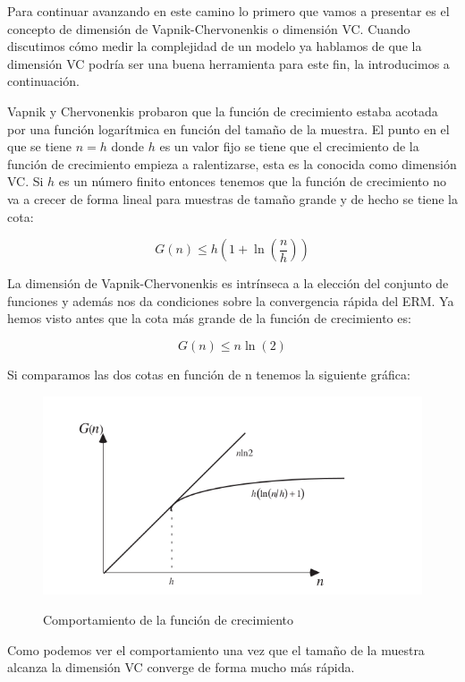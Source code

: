Para continuar avanzando en este camino lo primero que vamos a presentar es el concepto de dimensión de Vapnik-Chervonenkis o dimensión VC. Cuando discutimos cómo medir la complejidad de un modelo ya hablamos de que la dimensión VC podría ser una buena herramienta para este fin, la introducimos a continuación.

Vapnik y Chervonenkis probaron que la función de crecimiento estaba acotada por una función logarítmica en función del tamaño de la muestra. El punto en el que se tiene $n=h$ donde $h$ es un valor fijo se tiene que el crecimiento de la función de crecimiento empieza a ralentizarse, esta es la conocida como dimensión VC. Si $h$ es un número finito entonces tenemos que la función de crecimiento no va a crecer de forma lineal para muestras de tamaño grande y de hecho se tiene la cota:

$$G(n)\leq h(1+\ln (\frac{n}{h}))$$

La dimensión de Vapnik-Chervonenkis es intrínseca a la elección del conjunto de funciones y además nos da condiciones sobre la convergencia rápida del ERM. Ya hemos visto antes que la cota más grande de la función de crecimiento es:

$$G(n)\leq n\ln (2)$$

Si comparamos las dos cotas en función de n tenemos la siguiente gráfica:

\begin{figure}[H]
	\centering
	\includegraphics[scale=0.6]{imagenes/funcion_crecimiento_dimension_vc}
	\label{funcion_crecimiento_dimension_vc}
	\caption{Comportamiento de la función de crecimiento \cite[p.~107]{cherkassky_learning_2007}}
\end{figure}

Como podemos ver el comportamiento una vez que el tamaño de la muestra alcanza la dimensión VC converge de forma mucho más rápida.

